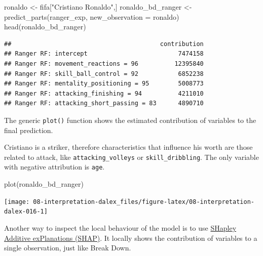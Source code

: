 \documentclass[
]{scrbook}
\newenvironment{Shaded}{\begin{snugshade}}{\end{snugshade}}
\newcommand{\AttributeTok}[1]{\textcolor[rgb]{0.77,0.63,0.00}{#1}}
\newcommand{\FunctionTok}[1]{\textcolor[rgb]{0.00,0.00,0.00}{#1}}
\newcommand{\NormalTok}[1]{#1}
\newcommand{\OtherTok}[1]{\textcolor[rgb]{0.56,0.35,0.01}{#1}}
\newcommand{\StringTok}[1]{\textcolor[rgb]{0.31,0.60,0.02}{#1}}
\renewenvironment{Shaded} {\begin{snugshade}\small} {\end{snugshade}}
\begin{document}
\begin{Shaded}
\begin{Highlighting}[]
\NormalTok{ronaldo }\OtherTok{\textless{}{-}}\NormalTok{ fifa[}\StringTok{"Cristiano Ronaldo"}\NormalTok{,]}
\NormalTok{ronaldo\_bd\_ranger }\OtherTok{\textless{}{-}} \FunctionTok{predict\_parts}\NormalTok{(ranger\_exp,}
                        \AttributeTok{new\_observation =}\NormalTok{ ronaldo)}
\FunctionTok{head}\NormalTok{(ronaldo\_bd\_ranger)}
\end{Highlighting}
\end{Shaded}

\begin{verbatim}
##                                         contribution
## Ranger RF: intercept                         7474158
## Ranger RF: movement_reactions = 96          12395840
## Ranger RF: skill_ball_control = 92           6852238
## Ranger RF: mentality_positioning = 95        5008773
## Ranger RF: attacking_finishing = 94          4211010
## Ranger RF: attacking_short_passing = 83      4890710
\end{verbatim}

The generic \texttt{plot()} function shows the estimated contribution of variables to the final prediction.

Cristiano is a striker, therefore characteristics that influence his worth are those related to attack, like \texttt{attacking\_volleys} or \texttt{skill\_dribbling}. The only variable with negative attribution is \texttt{age}.

\begin{Shaded}
\begin{Highlighting}[]
\FunctionTok{plot}\NormalTok{(ronaldo\_bd\_ranger)}
\end{Highlighting}
\end{Shaded}

\begin{center}\texttt{[image: 08-interpretation-dalex\_files/figure-latex/08-interpretation-dalex-016-1]} \end{center}

Another way to inspect the local behaviour of the model is to use \href{https://pbiecek.github.io/ema/shapley.html}{SHapley Additive exPlanations (SHAP)}. It locally shows the contribution of variables to a single observation, just like Break Down.
\end{document}
